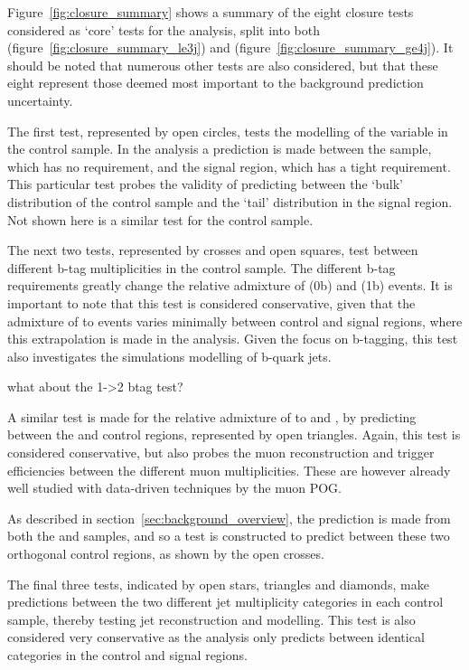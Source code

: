 Figure~\ref{fig:closure_summary} shows a summary of the eight closure tests 
considered as `core' tests for the analysis, split into both
\njlow (figure~\ref{fig:closure_summary_le3j}) 
and \njhigh (figure~\ref{fig:closure_summary_ge4j}). It should be noted that 
numerous other tests are also considered, but that these eight represent those 
deemed most important to the background prediction uncertainty.

The first test, represented by open circles, tests the modelling of the \alphat 
variable in the \mj control sample. In the analysis a prediction is made 
between the \mj sample, which has no \alphat requirement, and the 
signal region, which has a tight \alphat requirement. This particular test 
probes
the validity of predicting between the `bulk' distribution of the control sample
and the `tail' distribution in the signal region. Not shown here is a similar test
for the \mmj control sample.

The next two tests, represented by crosses and open squares, test between 
different b-tag multiplicities in the \mj control sample. The different b-tag 
requirements greatly change the relative admixture of \wj (0b) and \ttj (1b) events. 
 It is important to note that this test is 
considered conservative, given that the admixture of \wj to \ttj events 
varies minimally between control and signal regions, where this extrapolation is 
made in the analysis. Given the focus on b-tagging, this test also investigates
the simulations modelling of b-quark jets.

what about the 1->2 btag \mj test?

A similar test is made for the relative admixture of \zj to \wj and \ttj, by 
predicting between the \mj and \mmj control regions, represented by open 
triangles. Again, this test is considered 
conservative, but also probes the muon reconstruction and trigger efficiencies 
between the different muon multiplicities. These are however already well 
studied with data-driven techniques by the muon POG.

As described in section~\ref{sec:background_overview}, the \zinv prediction 
is made from both the \gj and \mmj samples, and so a test is constructed to 
predict between these two orthogonal control regions, as shown by the open 
crosses.

The final three tests, indicated by open stars, triangles and diamonds, make 
predictions between the two different jet multiplicity categories in each 
control sample, thereby 
testing jet reconstruction and modelling. This test is also considered very 
conservative as the analysis only predicts between identical \nj categories in 
the control and signal regions.

